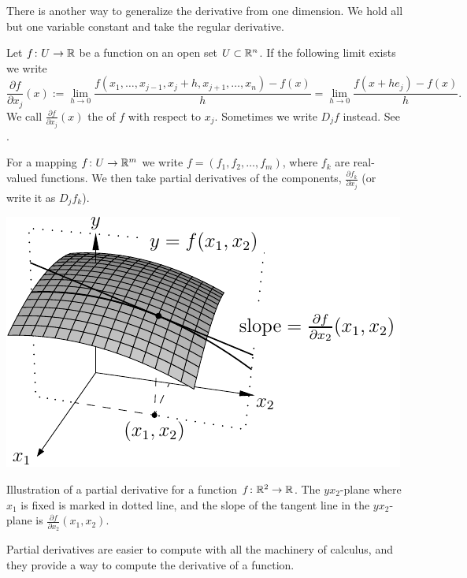 There is another way to generalize the derivative from one dimension.
We hold all but one variable constant and take the regular
derivative.

\begin{defn}
Let
$f \colon U \to {\mathbb{R}}$ be a function on an open set $U \subset {\mathbb{R}}^n$.
If the following limit exists we write
\begin{equation*}
\frac{\partial f}{\partial x_j} (x) := 
\lim_{h\to 0}\frac{f(x_1,\ldots,x_{j-1},x_j+h,x_{j+1},\ldots,x_n)-f(x)}{h}
=
\lim_{h\to 0}\frac{f(x+h e_j)-f(x)}{h} .
\end{equation*}
We call 
$\frac{\partial f}{\partial x_j} (x)$ the \emph{}
of $f$
with respect to $x_j$.  Sometimes we write $D_j f$ instead.
See .

For a mapping $f \colon U \to {\mathbb{R}}^m$ we write
$f = (f_1,f_2,\ldots,f_m)$, where $f_k$ are real-valued
functions.  We then take partial derivatives of
the components,
$\frac{\partial f_k}{\partial x_j}$ (or write it as $D_j f_k$).
\end{defn}

\begin{myfigureht}
\includegraphics{figures/svpartder}
\caption{Illustration of a partial derivative for a function $f \colon {\mathbb{R}}^2
\to {\mathbb{R}}$.  The $yx_2$-plane where $x_1$ is fixed is marked in dotted line,
and the slope of the tangent line in the $yx_2$-plane is
$\frac{\partial f}{\partial x_2}(x_1,x_2)$.\label{fig:svpartder}}
\end{myfigureht}

Partial derivatives are easier to compute with all the machinery of
calculus, and they provide a way to compute the derivative of a
function.

